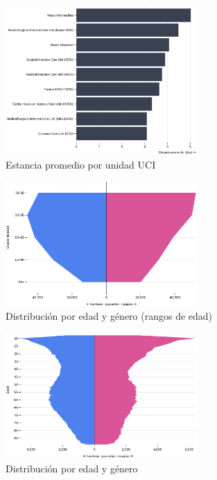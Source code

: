 \subsubsection{}





\begin{figure}[H]
  \centering
  \includegraphics[width=0.65\textwidth]{imagenes/chart1.png}
  \caption{Estancia promedio por unidad UCI}
  \label{fig:chart1}
\end{figure}


\begin{figure}[H]
  \centering
  \includegraphics[width=0.65\textwidth]{imagenes/chart2.png}
  \caption{Distribución por edad y género (rangos de edad)}
  \label{fig:chart2}
\end{figure}

\begin{figure}[H]
  \centering
  \includegraphics[width=0.65\textwidth]{imagenes/chart3.png}
  \caption{Distribución por edad y género}
  \label{fig:chart3}
\end{figure}






